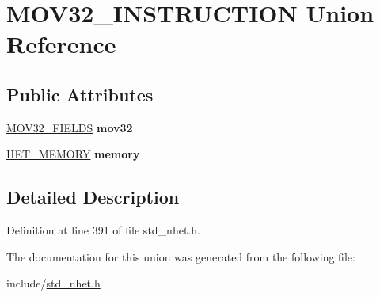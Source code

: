 \hypertarget{unionMOV32__INSTRUCTION}{}\section{M\+O\+V32\+\_\+\+I\+N\+S\+T\+R\+U\+C\+T\+I\+ON Union Reference}
\label{unionMOV32__INSTRUCTION}
\subsection*{Public Attributes}
\begin{DoxyCompactItemize}
\item 
\mbox{\label{unionMOV32__INSTRUCTION_a4b65dcbaf2b024e9dc4e7f5d4f33021b}} 
\mbox{\hyperlink{structMOV32__format}{M\+O\+V32\+\_\+\+F\+I\+E\+L\+DS}} {\bfseries mov32}
\item 
\mbox{\label{unionMOV32__INSTRUCTION_af37be92552e45e1e5dc514546b6d80ed}} 
\mbox{\hyperlink{structmemory__format}{H\+E\+T\+\_\+\+M\+E\+M\+O\+RY}} {\bfseries memory}
\end{DoxyCompactItemize}


\subsection{Detailed Description}


Definition at line 391 of file std\+\_\+nhet.\+h.



The documentation for this union was generated from the following file\+:\begin{DoxyCompactItemize}
\item 
include/\mbox{\hyperlink{std__nhet_8h}{std\+\_\+nhet.\+h}}\end{DoxyCompactItemize}
